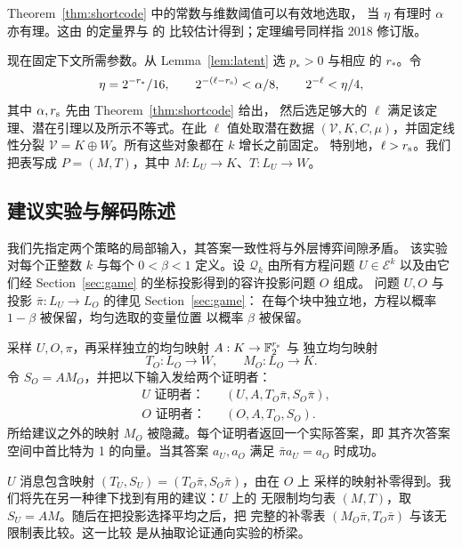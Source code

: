Theorem~\ref{thm:shortcode} 中的常数与维数阈值可以有效地选取，
当 $\eta$ 有理时 $\alpha$ 亦有理。这由 \cite[Theorem~2.13 and
Section~2.4]{KMS23} 的定量界与 \cite[Lemmas~2.7--2.8]{KMS23} 的
比较估计得到；定理编号同样指 2018 修订版。

现在固定下文所需参数。从 Lemma~\ref{lem:latent} 选 $p_*>0$ 与相应
的 $r_*$。令
\begin{equation}
 \eta=2^{-r_*}/16,
 \qquad
 2^{-(\ell-r_{\rm s})}<\alpha/8,
 \qquad
 2^{-\ell}<\eta/4,
 \label{eq:matrix-parameters}
\end{equation}
其中 $\alpha,r_{\rm s}$ 先由 Theorem~\ref{thm:shortcode} 给出，
然后选足够大的 $\ell$ 满足该定理、潜在引理以及所示不等式。在此
$\ell$ 值处取潜在数据 $(\mathcal V,K,C,\mu)$，并固定线性分裂
$\mathcal V=K\oplus W$。所有这些对象都在 $k$ 增长之前固定。
特别地，$\ell>r_{\rm s}$。我们把表写成 $P=(M,T)$，其中
$M:L_U\to K$、$T:L_U\to W$。

\subsection{建议实验与解码陈述}

我们先指定两个策略的局部输入，其答案一致性将与外层博弈间隙矛盾。
该实验对每个正整数 $k$ 与每个 $0<\beta<1$ 定义。设 $\mathcal Q_k$
由所有方程问题 $U\in\mathcal E^k$ 以及由它们经
Section~\ref{sec:game} 的坐标投影得到的容许投影问题 $O$ 组成。
问题 $U,O$ 与投影 $\bar\pi:L_U\to L_O$ 的律见 Section~\ref{sec:game}：
在每个块中独立地，方程以概率 $1-\beta$ 被保留，均匀选取的变量位置
以概率 $\beta$ 被保留。

\begin{definition}[投影建议实验]
\label{def:projected-advice}
采样 $U,O,\pi$，再采样独立的均匀映射 $A:K\to\mathbb F_2^{r_{\rm s}}$ 与
独立均匀映射
\[
 T_O:L_O\to W,\qquad M_O:L_O\to K.
\]
令 $S_O=AM_O$，并把以下输入发给两个证明者：
\begin{equation}
 \begin{aligned}
  &\text{$U$ 证明者：}&& (U,A,T_O\bar\pi,S_O\bar\pi),\\
  &\text{$O$ 证明者：}&& (O,A,T_O,S_O).
 \end{aligned}
 \label{eq:projected-advice}
\end{equation}
所给建议之外的映射 $M_O$ 被隐藏。每个证明者返回一个实际答案，即
其齐次答案空间中首比特为 1 的向量。当其答案 $a_U,a_O$ 满足
$\bar\pi a_U=a_O$ 时成功。
\end{definition}

$U$ 消息包含映射 $(T_U,S_U)=(T_O\bar\pi,S_O\bar\pi)$，由在 $O$ 上
采样的映射补零得到。我们将先在另一种律下找到有用的建议：$U$ 上的
无限制均匀表 $(M,T)$，取 $S_U=AM$。随后在把投影选择平均之后，把
完整的补零表 $(M_O\bar\pi,T_O\bar\pi)$ 与该无限制表比较。这一比较
是从抽取论证通向实验的桥梁。

